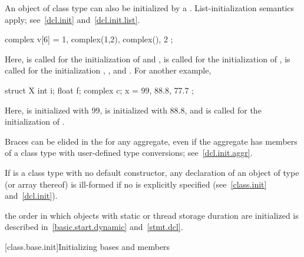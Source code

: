 \pnum
{}%
%
An object of class type can also be initialized by a
. List-initialization semantics apply;
see~\ref{dcl.init} and~\ref{dcl.init.list}. \begin{example}

\begin{codeblock}
complex v[6] = { 1, complex(1,2), complex(), 2 };
\end{codeblock}

Here,
is called for the initialization of
and
,
is called for the initialization of
,
is called for the initialization
,
,
and
.
For another example,

\begin{codeblock}
struct X {
  int i;
  float f;
  complex c;
} x = { 99, 88.8, 77.7 };
\end{codeblock}

Here,
is initialized with 99,
is initialized with 88.8, and
is called for the initialization of
.
\end{example}
\begin{note}
Braces can be elided in the
for any aggregate, even if the aggregate has members of a class type with
user-defined type conversions; see~\ref{dcl.init.aggr}.
\end{note}

\pnum
\begin{note}
If
is a class type with no default constructor,
any declaration of an object of type
(or array thereof) is ill-formed if no
is explicitly specified (see~\ref{class.init} and~\ref{dcl.init}).
\end{note}

\pnum
\begin{note}
%
the order in which objects with static or thread storage duration
are initialized is described in~\ref{basic.start.dynamic} and~\ref{stmt.dcl}.
\end{note}

[class.base.init]{Initializing bases and members}%
%

